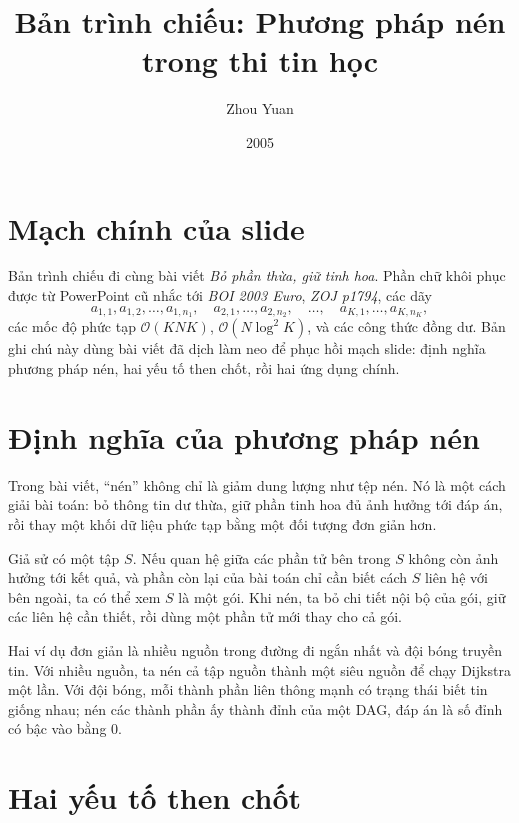 \documentclass[11pt]{article}
\title{Bản trình chiếu: Phương pháp nén trong thi tin học}
\author{Zhou Yuan}
\date{2005}
\newcommand{\Oh}{\mathcal{O}}
\begin{document}
\maketitle


\section{Mạch chính của slide}

Bản trình chiếu đi cùng bài viết \emph{Bỏ phần thừa, giữ tinh hoa}. Phần chữ
khôi phục được từ PowerPoint cũ nhắc tới \textit{BOI 2003 Euro}, \textit{ZOJ
p1794}, các dãy
\[
  a_{1,1},a_{1,2},\ldots,a_{1,n_1},\quad
  a_{2,1},\ldots,a_{2,n_2},\quad
  \ldots,\quad
  a_{K,1},\ldots,a_{K,n_K},
\]
các mốc độ phức tạp \(\Oh(KNK)\), \(\Oh(N\log^2K)\), và các công thức đồng
dư. Bản ghi chú này dùng bài viết đã dịch làm neo để phục hồi mạch slide:
định nghĩa phương pháp nén, hai yếu tố then chốt, rồi hai ứng dụng chính.

\section{Định nghĩa của phương pháp nén}

Trong bài viết, ``nén'' không chỉ là giảm dung lượng như tệp nén. Nó là một
cách giải bài toán: bỏ thông tin dư thừa, giữ phần tinh hoa đủ ảnh hưởng tới
đáp án, rồi thay một khối dữ liệu phức tạp bằng một đối tượng đơn giản hơn.

Giả sử có một tập \(S\). Nếu quan hệ giữa các phần tử bên trong \(S\) không
còn ảnh hưởng tới kết quả, và phần còn lại của bài toán chỉ cần biết cách
\(S\) liên hệ với bên ngoài, ta có thể xem \(S\) là một gói. Khi nén, ta bỏ
chi tiết nội bộ của gói, giữ các liên hệ cần thiết, rồi dùng một phần tử mới
thay cho cả gói.

Hai ví dụ đơn giản là nhiều nguồn trong đường đi ngắn nhất và đội bóng truyền
tin. Với nhiều nguồn, ta nén cả tập nguồn thành một siêu nguồn để chạy
Dijkstra một lần. Với đội bóng, mỗi thành phần liên thông mạnh có trạng thái
biết tin giống nhau; nén các thành phần ấy thành đỉnh của một DAG, đáp án là
số đỉnh có bậc vào bằng \(0\).

\section{Hai yếu tố then chốt}
\end{document}
